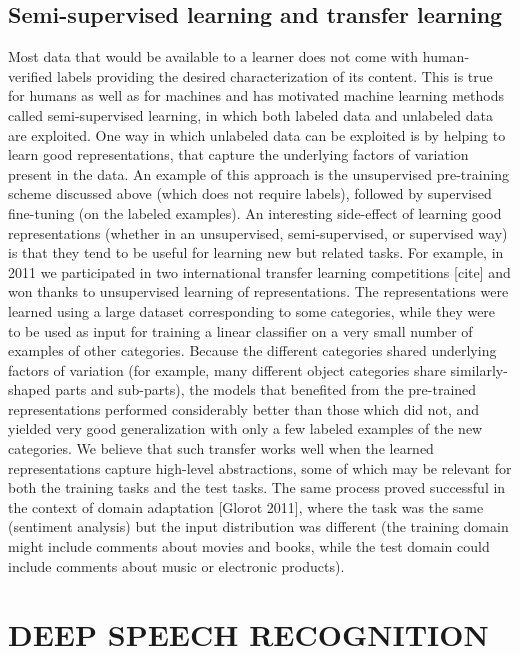 \documentclass{article} %
\begin{document}
\subsection{Semi-supervised learning and transfer learning}


Most data that would be available to a learner does not come with
human-verified labels providing the desired characterization of its
content. This is true for humans as well as for machines and has motivated
machine learning methods called semi-supervised learning, in which both
labeled data and unlabeled data are exploited. One way in which unlabeled
data can be exploited is by helping to learn good representations, that
capture the underlying factors of variation present in the data. An example
of this approach is the unsupervised pre-training scheme discussed above
(which does not require labels), followed by supervised fine-tuning (on the
labeled examples). An interesting side-effect of learning good
representations (whether in an unsupervised, semi-supervised, or supervised
way) is that they tend to be useful for learning new but related tasks. For
example, in 2011 we participated in two international transfer learning
competitions [cite] and won thanks to unsupervised learning of
representations. The representations were learned using a large dataset
corresponding to some categories, while they were to be used as input for
training a linear classifier on a very small number of examples of other
categories. Because the different categories shared underlying factors of
variation (for example, many different object categories share
similarly-shaped parts and sub-parts), the models that benefited from the
pre-trained representations performed considerably better than those which
did not, and yielded very good generalization with only a few labeled
examples of the new categories. We believe that such transfer works well
when the learned representations capture high-level abstractions, some of
which may be relevant for both the training tasks and the test tasks. The
same process proved successful in the context of domain adaptation [Glorot
  2011], where the task was the same (sentiment analysis) but the input
distribution was different (the training domain might include comments
about movies and books, while the test domain could include comments about
music or electronic products).


\section{DEEP SPEECH RECOGNITION}
\end{document}
